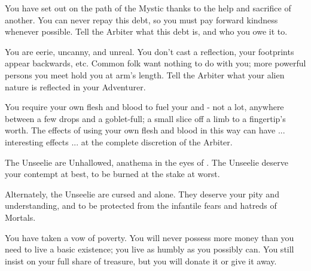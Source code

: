 \begin{multicols*}{2}
  You have set out on the path of the Mystic thanks to the help and sacrifice of another. You can never repay this debt, so you must pay forward kindness whenever possible. Tell the Arbiter what this debt is, and who you owe it to.


  You are eerie, uncanny, and unreal. You don't cast a reflection, your footprints appear backwards, etc. Common folk want nothing to do with you; more powerful persons you meet hold you at arm's length. Tell the Arbiter what your alien nature is reflected in your Adventurer.


  You require your own flesh and blood to fuel your  and  - not a lot, anywhere between a few drops and a goblet-full; a small slice off a limb to a fingertip's worth. The effects of using your own flesh and blood in this way can have ... interesting effects ... at the complete discretion of the Arbiter.


  The Unseelie are Unhallowed, anathema in the eyes of \TheAuthority. The Unseelie deserve your contempt at best, to be burned at the stake at worst.

  Alternately, the Unseelie are cursed and alone. They deserve your pity and understanding, and to be protected from the infantile fears and hatreds of Mortals.


  You have taken a vow of poverty. You will never possess more money than you need to live a basic existence; you live as humbly as you possibly can. You still insist on your full share of treasure, but you will donate it or give it away. 




\end{multicols*}
